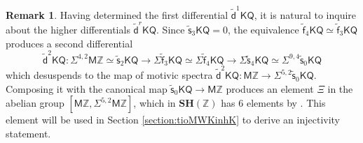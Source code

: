 \documentclass[11pt,hyp,english]{article}
\newcommand{\Z}{\mathbb{Z}}
\renewcommand{\AA}{\mathcal{A}}
\newcommand{\KQ}{\mathsf{KQ}}
\newcommand{\MZ}{\mathsf{M}\Z}
\newcommand{\HZ}{\mathsf{M}\Z}
\newcommand{\cHZ}{\wt{{\mathsf{M}}}{\Z}}
\newcommand{\SH}{\mathbf{SH}}
\newcommand{\wt}[1]{\widetilde{#1}}
\newcommand{\s}{\mathsf{s}}
\newcommand{\vs}{\tilde{\mathsf{s}}}
\newcommand{\vf}{\tilde{{\mathsf{f}}}}
\newcommand{\vd}{{\tilde{\mathsf{d}}}}
\theoremstyle{definition}
\newtheorem{remark}[theorem]{Remark}
\begin{document}


\begin{remark}
\label{remark:xi}
Having determined the first differential $\vd^1\KQ $, 
it is natural to inquire about the higher differentials $\vd^r\KQ$.
Since $\vs_3\KQ=0$, the equivalence $\vf_4\KQ\simeq \vf_3\KQ$ produces a second differential
\[ \vd^2\KQ\colon \Sigma^{4,2}\MZ\simeq \vs_2\KQ \to \Sigma\vf_3\KQ\simeq \Sigma\vf_4\KQ \to \Sigma\vs_4\KQ\simeq \Sigma^{9,4}\vs_0\KQ\]
which desuspends to the map of motivic spectra
$\vd^2\KQ\colon \MZ\to \Sigma^{5,2}\vs_0\KQ$.
Composing it with the canonical map $\vs_0\KQ\to \MZ$ produces an element $\Xi$ in the abelian group $[\MZ,\Sigma^{5,2}\MZ]$, which in $\SH(\Z)$ has $6$ elements by .
This element will be used in Section \ref{section:tioMWKinhK} to derive an injectivity statement.
\end{remark}


\end{document}
